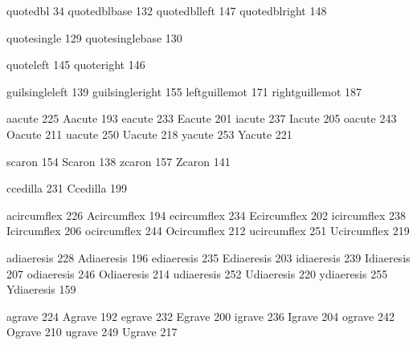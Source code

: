  quotedbl          34
 quotedblbase     132
 quotedblleft     147
 quotedblright    148

 quotesingle      129
 quotesinglebase  130 

 quoteleft        145
 quoteright       146

 guilsingleleft   139 
 guilsingleright  155 
 leftguillemot    171
 rightguillemot   187

 aacute           225
 Aacute           193
 eacute           233
 Eacute           201
 iacute           237
 Iacute           205
 oacute           243
 Oacute           211
 uacute           250
 Uacute           218
 yacute           253
 Yacute           221

 scaron           154
 Scaron           138
 zcaron           157
 Zcaron           141

 ccedilla         231
 Ccedilla         199

 acircumflex      226
 Acircumflex      194
 ecircumflex      234
 Ecircumflex      202
 icircumflex      238
 Icircumflex      206
 ocircumflex      244
 Ocircumflex      212
 ucircumflex      251
 Ucircumflex      219

 adiaeresis       228      
 Adiaeresis       196      
 ediaeresis       235      
 Ediaeresis       203
 idiaeresis       239
 Idiaeresis       207
 odiaeresis       246
 Odiaeresis       214
 udiaeresis       252
 Udiaeresis       220
 ydiaeresis       255
 Ydiaeresis       159

 agrave           224
 Agrave           192
 egrave           232
 Egrave           200
 igrave           236
 Igrave           204
 ograve           242
 Ograve           210
 ugrave           249
 Ugrave           217

